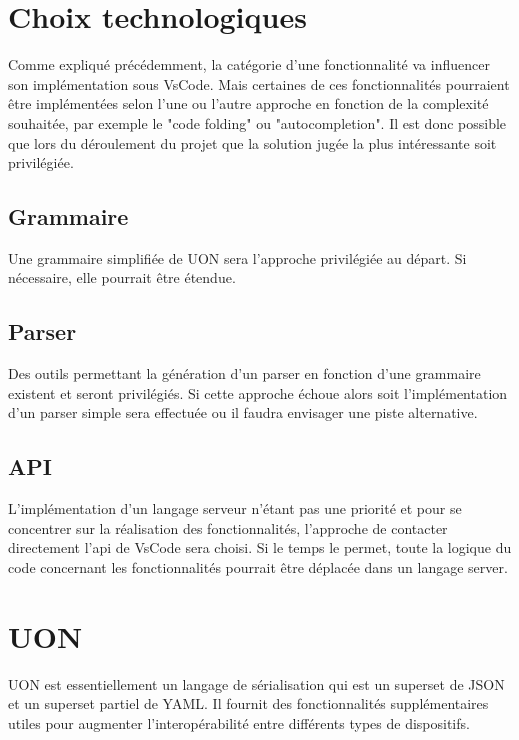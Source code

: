 \documentclass[
    iict, %
    il, %
]{heig-tb}
\begin{document}
\section{Choix technologiques}
Comme expliqué précédemment, la catégorie d'une fonctionnalité va influencer son implémentation sous VsCode. Mais certaines de ces fonctionnalités pourraient être implémentées selon l'une ou l'autre approche en fonction de la complexité souhaitée, par exemple le  "code folding" ou "autocompletion". Il est donc possible que lors du déroulement du projet que la solution jugée la plus intéressante soit privilégiée.

\subsection{Grammaire}
Une grammaire simplifiée de UON sera l'approche privilégiée au départ. Si nécessaire, elle pourrait être étendue.

\subsection{Parser}
Des outils permettant la génération d'un parser en fonction d'une grammaire existent et seront privilégiés. Si cette approche échoue alors soit l'implémentation d'un parser simple sera effectuée ou il faudra envisager une piste alternative.

\subsection{API}
L'implémentation d'un langage serveur n'étant pas une priorité et pour se concentrer sur la réalisation des fonctionnalités, l'approche de contacter directement l'api de VsCode sera choisi. Si le temps le permet, toute la logique du code concernant les fonctionnalités pourrait être déplacée dans un langage server. 

\section{UON}
UON est essentiellement un langage de sérialisation qui est un superset de JSON et un superset partiel de YAML. Il fournit des fonctionnalités supplémentaires utiles pour augmenter l'interopérabilité entre différents types de dispositifs.
\end{document}
